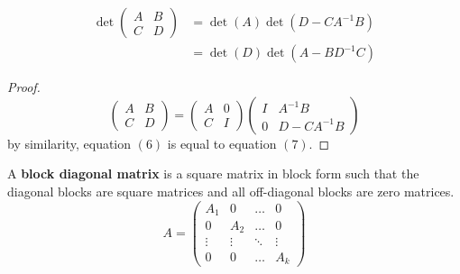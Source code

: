   \begin{theorem}
    \label{thm:schur-complement-determinant-formulas}
    \begin{align}
      \det{\begin{pmatrix} A&B\\C&D \end{pmatrix}}  & = \det{(A)} \det{(D - C A^{-1} B)} \\
      & = \det{(D)} \det{(A - B D^{-1} C)}
    \end{align}
  \end{theorem}
  \begin{proof}
    \begin{equation}
      \begin{pmatrix} A&B\\C&D\end{pmatrix} = \begin{pmatrix}
      A&0\\C&I\end{pmatrix} \begin{pmatrix}
      I& A^{-1} B \\ 0 & D - C A^{-1} B
      \end{pmatrix}
    \end{equation}
    by similarity, equation $(6)$ is equal to equation $(7)$. 
  \end{proof}

  \begin{definition}
    \label{def:block-diagonal-matrix}
    A \textbf{block diagonal matrix} is a square matrix in block form such that the diagonal blocks are square matrices and all off-diagonal blocks are zero matrices. 
    \begin{equation}
      A = \begin{pmatrix}
      A_1&0&\ldots&0\\
      0&A_2&\ldots&0\\
      \vdots&\vdots&\ddots&\vdots\\
      0&0&\ldots&A_k
      \end{pmatrix}
    \end{equation}
  \end{definition}


